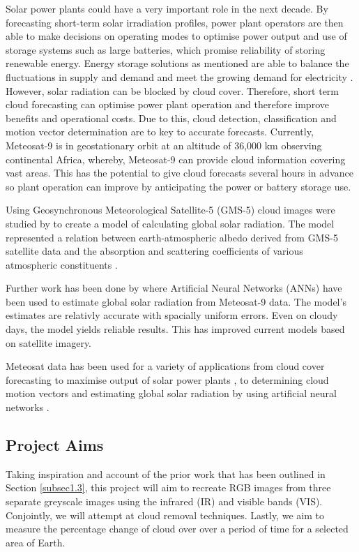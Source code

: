 Solar power plants could have a very important role in the next decade. By forecasting short-term solar irradiation profiles, power plant operators are then able to make decisions on operating modes to optimise power output and use of storage systems such as large batteries, which promise reliability of storing renewable energy. Energy storage solutions as mentioned are able to balance the fluctuations in supply and demand and meet the growing demand for electricity \cite{joseph2006battery}. However, solar radiation can be blocked by cloud cover. Therefore, short term cloud forecasting can optimise power plant operation and therefore improve benefits and operational costs. Due to this, cloud detection, classification and motion vector determination are to key to accurate forecasts. Currently, Meteosat-9 is in geostationary orbit at an altitude of 36,000 km \cite{MS2G} observing continental Africa, whereby, Meteosat-9 can provide cloud information covering vast areas. This has the potential to give cloud forecasts several hours in advance so plant operation can improve by anticipating the power or battery storage use.
\par
Using Geosynchronous Meteorological Satellite-5 (GMS-5) cloud images were studied by \cite{janjai2009model} to create a model of calculating global solar radiation. The model represented a relation between earth-atmospheric albedo derived from GMS-5 satellite data and the absorption and scattering coefficients of various atmospheric constituents \cite{janjai2009model}.
\par
Further work has been done by \cite{globsol_NN} where Artificial Neural Networks (ANNs) have been used to estimate global solar radiation from Meteosat-9 data. The model's estimates are relativly accurate with spacially uniform errors. Even on cloudy days, the model yields reliable results. This has improved current models based on satellite imagery. \cite{janjai2009model}
\par
Meteosat data has been used for a variety of applications from cloud cover forecasting to maximise output of solar power plants \cite{cloud_forcast}, to determining cloud motion vectors \cite{cloudmotion} and estimating global solar radiation by using artificial neural networks \cite{globsol_NN}. 

\subsection{Project Aims}\label{subsec1.4}

Taking inspiration and account of the prior work that has been outlined in Section \ref{subsec1.3}, this project will aim to recreate RGB images from three separate greyscale images using the infrared (IR) and visible bands (VIS). Conjointly, we will attempt at cloud removal techniques. Lastly, we aim to measure the percentage change of cloud over over a period of time for a selected area of Earth.



